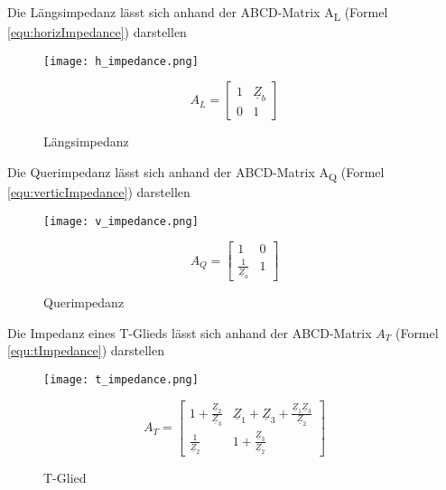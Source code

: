 Die Längsimpedanz lässt sich anhand der ABCD-Matrix A\textsubscript{L} (Formel \ref{equ:horizImpedance}) darstellen
\begin{figure}[H]
	\begin{minipage}[h]{0.45\linewidth}
		\centering
		\texttt{[image: h\_impedance.png]}
		\caption{Längsimpedanz}
	\end{minipage}
	\begin{minipage}[h]{0.45\linewidth}
		\centering
		\begin{equation}\label{equ:horizImpedance}
			A_L = \left[\begin{matrix}
			1&\underline{Z}_b\\0&1
			\end{matrix}\right]
		\end{equation}
	\end{minipage}
\end{figure}
Die Querimpedanz lässt sich anhand der ABCD-Matrix A\textsubscript{Q} (Formel \ref{equ:verticImpedance}) darstellen
\begin{figure}[H]
	\begin{minipage}[h]{0.45\linewidth}
		\centering
		\texttt{[image: v\_impedance.png]}
		\caption{Querimpedanz}
	\end{minipage}
	\begin{minipage}[h]{0.45\linewidth}
		\centering
		\begin{equation}\label{equ:verticImpedance}
			A_Q = \left[\begin{matrix}
			1&0\\\frac{1}{\underline{Z}_a}&1
			\end{matrix}\right]
		\end{equation}
	\end{minipage}
\end{figure}
Die Impedanz eines T-Glieds lässt sich anhand der ABCD-Matrix $A_T$ (Formel \ref{equ:tImpedance}) darstellen
\begin{figure}[H]
	\begin{minipage}[h]{0.45\linewidth}
		\centering
		\texttt{[image: t\_impedance.png]}\label{fig:tImpedance}
		\caption{T-Glied}
	\end{minipage}
	\begin{minipage}[h]{0.45\linewidth}
		\centering
		\begin{equation}\label{equ:tImpedance}
			A_T = \left[\begin{matrix}
			1+\frac{\underline{Z}_2}{\underline{Z}_3}&\underline{Z}_1+\underline{Z}_3+\frac{\underline{Z}_1\underline{Z}_3}{\underline{Z}_2}\\
			\frac{1}{\underline{Z}_2}&1+\frac{\underline{Z}_3}{\underline{Z}_2}
			\end{matrix}\right]
		\end{equation}
	\end{minipage}
\end{figure}

